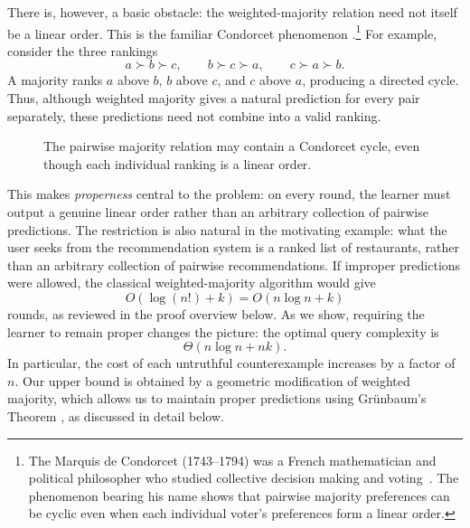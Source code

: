 \documentclass[11pt]{article}
\theoremstyle{definition}
\theoremstyle{remark}
\begin{document}
There is, however, a basic obstacle: the weighted-majority relation need not
itself be a linear order. This is the familiar Condorcet phenomenon
\cite{Black1958}.\footnote{The Marquis de Condorcet (1743--1794) was a
French mathematician and political philosopher who studied collective
decision making and voting~\cite{Condorcet1785}. The phenomenon bearing his name shows that
pairwise majority preferences can be cyclic even when each individual
voter's preferences form a linear order.} For example, consider the three
rankings
\[
    a \succ b \succ c,
    \qquad
    b \succ c \succ a,
    \qquad
    c \succ a \succ b.
\]
A majority ranks $a$ above $b$, $b$ above $c$, and $c$ above $a$, producing
a directed cycle. Thus, although weighted majority gives a natural prediction
for every pair separately, these predictions need not combine into a valid
ranking.
\begin{figure}[t]
    \centering

    \caption{The pairwise majority relation may contain a Condorcet cycle,
    even though each individual ranking is a linear order.}
    \label{fig:condorcet}
\end{figure}
This makes \emph{properness} central to the problem: on every round, the
learner must output a genuine linear order rather than an arbitrary
collection of pairwise predictions. The restriction is also natural in the motivating example: what the user seeks
from the recommendation system is a ranked list of restaurants, rather than
an arbitrary collection of pairwise recommendations. 
If improper predictions were allowed, the classical weighted-majority
algorithm \cite{LittlestoneWarmuth1994} would give
\[
    O(\log(n!)+k)=O(n\log n+k)
\]
rounds, as reviewed in the proof overview below. As we show, requiring the learner to remain proper changes the
picture: the optimal query complexity is
\[
    \Theta(n\log n+nk).
\]
In particular, the cost of each untruthful counterexample increases by a
factor of $n$. Our upper bound is obtained by a geometric modification of
weighted majority, which allows us to maintain proper predictions using
Gr\"unbaum's Theorem \cite{Grunbaum1960}, as discussed in detail below.
\end{document}
